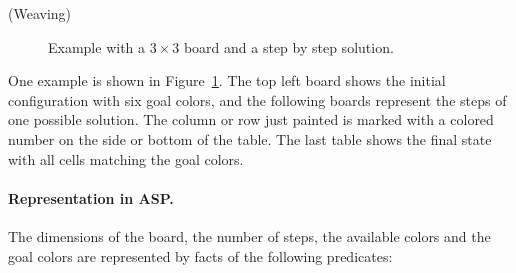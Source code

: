 \documentclass[a4paper,12pt]{article}
\begin{document}
\begin{PraktikumsAufgabe}{2}{(Weaving)}
\begin{figure}[h]
\begin{center}
\end{center}
\vspace*{-6mm}
\caption{Example with a $3\times 3$ board and a step by step solution.\label{fig:weaving}}
\end{figure}

\noindent
One example is shown in Figure~\ref{fig:weaving}.
The top left board shows the initial configuration with six goal colors,
and the following boards represent the steps of one possible solution.
The column or row just painted is marked with a colored number on the side or bottom of the table.
The last table shows the final state with all cells matching the goal colors.

\paragraph{Representation in ASP.}
The dimensions of the board,
the number of steps,
the available colors
and the goal colors are represented by facts of the following predicates:


\end{PraktikumsAufgabe}
\end{document}
